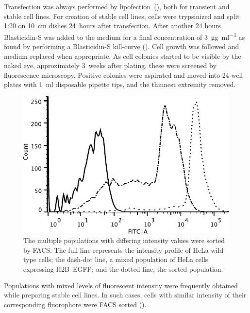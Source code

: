     Transfection was always performed by lipofection~(),
    both for transient and stable cell lines. For creation of stable cell lines,
    cells were trypsinized and split 1:20 on \SI{10}{\cm} dishes 24~hours after transfection.
    After another 24 hours, Blasticidin-S was added to the medium for
    a final concentration of \SI{3}{\ug\per\ml} as found by performing a
    Blasticidin-S kill-curve ().
    Cell growth was followed and medium replaced when appropriate.
    As cell colonies started to be visible by the naked eye, approximately
    3~weeks after plating, these were screened by fluorescence microscopy.
    Positive colonies were aspirated and moved into 24-well plates with
    \SI{1}{\ml} disposable pipette tips, and the thinnest extremity removed.

    \begin{figure}
      \centering
      \includegraphics[width=\textwidth]{kill-frap/figs/facs-stable-cell-lines.pdf}
        {
          The multiple populations with differing intensity values were
          sorted by FACS. The full line represents the intensity profile
          of HeLa wild type cells; the dash-dot line, a mixed population
          of HeLa cells expressing H2B--EGFP; and the dotted line, the
          sorted population.
        }
      \label{fig:methods:facs}
    \end{figure}

    Populations with mixed levels of fluorescent intensity were frequently
    obtained while preparing stable cell lines. In such cases, cells with
    similar intensity of their corresponding fluorophore were FACS
    sorted ().

